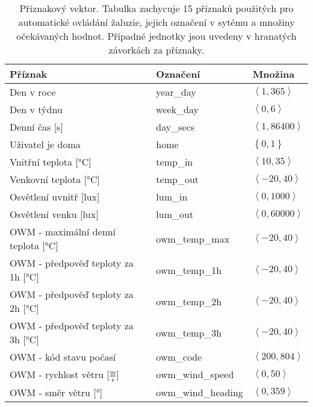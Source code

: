 \begin{table}[htbp]
  \centering
    \begin{tabular}{l|l|l}
    Příznak & Označení & Množina \\
    \midrule
    \midrule
    Den v roce & year\_day & $\left\langle 1, 365\right\rangle $ \\
    \midrule
    Den v týdnu & week\_day & $\left\langle 0, 6\right\rangle $ \\
    \midrule
    Denní čas [s] & day\_secs & $\left\langle 1, 86400\right\rangle $ \\
    \midrule
    Uživatel je doma & home  & $\left\{  0,1\right\}  $ \\
    \midrule
    Vnitřní teplota  [°C]& temp\_in & $\left\langle 10, 35\right\rangle $ \\
    \midrule
    Venkovní teplota  [°C]& temp\_out & $\left\langle -20, 40\right\rangle $ \\
    \midrule
    Osvětlení uvnitř [lux]& lum\_in & $\left\langle 0, 1000\right\rangle $ \\
    \midrule
    Osvětlení venku [lux]& lum\_out & $\left\langle 0, 60000\right\rangle $ \\
    \midrule
    OWM - maximální denní teplota  [°C]& owm\_temp\_max & $\left\langle -20, 40\right\rangle $ \\
    \midrule
    OWM - předpověď teploty za 1h  [°C]& owm\_temp\_1h & $\left\langle -20, 40\right\rangle $ \\
    \midrule
    OWM -  předpověď teploty za 2h  [°C]& owm\_temp\_2h & $\left\langle -20, 40\right\rangle $ \\
    \midrule
    OWM -  předpověď teploty za 3h [°C] & owm\_temp\_3h & $\left\langle -20, 40\right\rangle $ \\
    \midrule
    OWM - kód stavu počasí & owm\_code & $\left\langle 200, 804\right\rangle $ \\
    \midrule
    OWM - rychlost větru  [$\frac{\mathrm{m}}{\mathrm{s}}$]& owm\_wind\_speed & $\left\langle 0, 50\right\rangle $ \\
    \midrule
    OWM - směr větru [°]& owm\_wind\_heading & $\left\langle 0, 359\right\rangle $ \\
    \bottomrule
    \bottomrule
    \end{tabular}%
    \caption[Příznakový vektor]{Příznakový vektor. Tabulka zachycuje 15 příznaků použitých pro automatické ovládání žaluzie, jejich označení v sytému a množiny očekávaných hodnot. Případné jednotky jsou uvedeny v hranatých závorkách za příznaky.}
  \label{tab:features}%
\end{table}%
